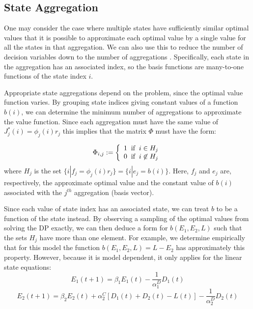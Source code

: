 \documentclass[conference]{IEEEtran}
\begin{document}
 \subsection{State Aggregation}
    
    One may consider the case where multiple states have sufficiently similar optimal values that it is possible to approximate each optimal value by a single value for all the states in that aggregation. We can also use this to reduce the number of decision variables down to the number of aggregations \cite{5717627}. Specifically, each state in the aggregation has an associated index, so the basis functions are many-to-one functions of the state index $i$.
    
    Appropriate state aggregations depend on the problem, since the optimal value function varies. By grouping state indices giving constant values of a function $b(i)$, we can determine the minimum number of aggregations to approximate the value function. Since each aggregation must have the same value of $J^{*}_{j}(i) = \phi_{j}(i)r_{j}$ this implies that the matrix $\Phi$ must have the form:
    
    \begin{displaymath}
        \Phi_{i,j}:=\left\{
            \begin{array}{l}
            1 \hspace{0.2cm} \text{if} \hspace{0.2cm} i\in H_{j}\\
            0 \hspace{0.2cm} \text{if} \hspace{0.2cm} i\not\in H_{j}
            \end{array}
            \right.
    \end{displaymath}where $H_{j}$ is the set $\{i|f_{j} = \phi_{j}(i)r_{j}\}=\{i|e_{j} = b(i)\}$. Here, $f_{j}$ and $e_{j}$ are, respectively, the approximate optimal value and the constant value of $b(i)$ associated with the $j^{th}$ aggregation (basis vector).
    
    Since each value of state index has an associated state, we can treat $b$ to be a function of the state instead. By observing a sampling of the optimal values from solving the DP exactly, we can then deduce a form for $b(E_{1},E_{2},L)$ such that the sets $H_{j}$ have more than one element. For example, we determine empirically that for this model the function $b(E_{1},E_{2},L)=L-E_{2}$ has approximately this property. However, because it is model dependent, it only applies for the linear state equations:
	\begin{displaymath}E_{1}(t+1)=\beta_{1}E_{1}(t)-\frac{1}{\alpha_{1}^{D}}D_{1}(t)\end{displaymath}
	\begin{displaymath}E_{2}(t+1)=\beta_{2}E_{2}(t)+\alpha_{2}^{C}[D_{1}(t)+D_{2}(t)-L(t)]-\frac{1}{\alpha_{2}^{D}}D_{2}(t)\end{displaymath}
	
\end{document}
